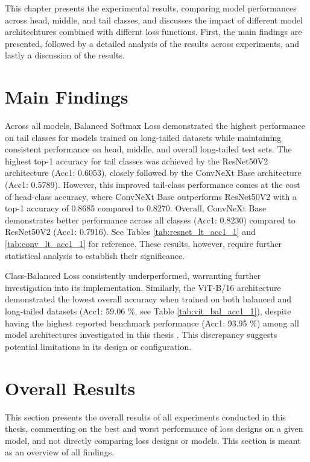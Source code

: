 This chapter presents the experimental results, comparing model performances across head, middle, and tail classes, and discusses the impact of different model architechtures combined with differnt loss functions. First, the main findings are presented, followed by a detailed analysis of the results across experiments, and lastly a discussion of the results. 


\section{Main Findings}
Across all models, Balanced Softmax Loss demonstrated the highest performance on tail classes for models trained on long-tailed datasets while maintaining consistent performance on head, middle, and overall long-tailed test sets. The highest top-1 accuracy for tail classes was achieved by the ResNet50V2 architecture (Acc1: 0.6053), closely followed by the ConvNeXt Base architecture (Acc1: 0.5789). However, this improved tail-class performance comes at the cost of head-class accuracy, where ConvNeXt Base outperforms ResNet50V2 with a top-1 accuracy of 0.8685 compared to 0.8270. Overall, ConvNeXt Base demonstrates better performance across all classes (Acc1: 0.8230) compared to ResNet50V2 (Acc1: 0.7916). See Tables \ref{tab:resnet_lt_acc1_1} and \ref{tab:conv_lt_acc1_1} for reference. These results, however, require further statistical analysis to establish their significance.

Class-Balanced Loss consistently underperformed, warranting further investigation into its implementation. Similarly, the ViT-B/16 architecture demonstrated the lowest overall accuracy when trained on both balanced and long-tailed datasets (Acc1: 59.06 \%, see Table \ref{tab:vit_bal_acc1_1}), despite having the highest reported benchmark performance (Acc1: 93.95 \%) among all model architectures investigated in this thesis \cite{Tseng_2022}. This discrepancy suggests potential limitations in its design or configuration.


\section{Overall Results}
This section presents the overall results of all experiments conducted in this thesis, commenting on the best and worst performance of loss designs on a given model, and not directly comparing loss designs or models. This section is meant as an overview of all findings.

